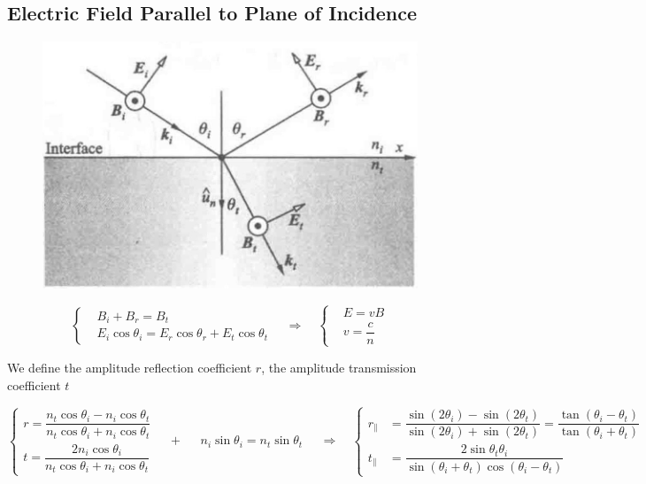 \subsection{Electric Field Parallel to Plane of Incidence}

\begin{figure}[H]
  \centering
  \includegraphics[width=0.4\linewidth]{figures/Fresnel-parallel}
\end{figure}

\begin{equation*}
 \left\{
  \begin{aligned}
    & B_i + B_r = B_t \\
    & E_i \cos \theta_i = E_r \cos \theta_r + E_t \cos \theta_t
  \end{aligned}
  \right.
  \quad \Rightarrow \quad
  \left\{
  \begin{aligned}
    & E = v B \\
    & v = \dfrac{c}{n}
  \end{aligned}
  \right.
\end{equation*}

We define the amplitude reflection coefficient $r$, the amplitude transmission coefficient $t$

\begin{equation*}
  \left\{
  \begin{aligned}
    r = \dfrac{n_t \cos \theta_i - n_i \cos \theta_t}{n_t \cos \theta_i + n_i \cos \theta_t} \\
    t = \dfrac{2 n_i \cos \theta_i}{n_t \cos \theta_i + n_i \cos \theta_t} 
  \end{aligned}
  \right.
  \quad + \quad
  \begin{aligned}
    n_i \sin \theta_i = n_t \sin \theta_t
  \end{aligned}
  \quad \Rightarrow \quad
  \left\{
  \begin{aligned}
    r_{\parallel} &= \dfrac{\sin \left( 2 \theta_i \right) - \sin \left( 2 \theta_t \right)}{\sin \left( 2 \theta_i \right) + \sin \left( 2 \theta_t \right)} = \dfrac{\tan \left( \theta_i - \theta_t \right)}{\tan \left( \theta_i + \theta_t \right)} \\
    t_{\parallel} &= \dfrac{2 \sin \theta_t \theta_i}{\sin \left( \theta_i + \theta_t \right) \cos \left( \theta_i - \theta_t \right)} 
  \end{aligned}
  \right.
\end{equation*}

